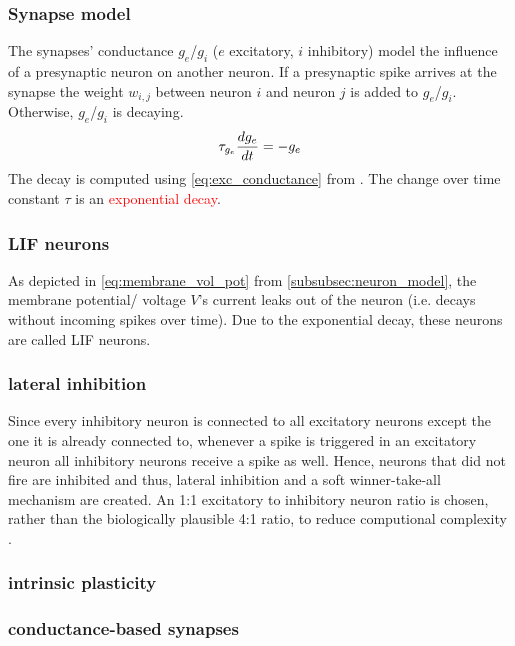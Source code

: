 \subsubsection{Synapse model}
\label{subsubsec:synapse_model}
The synapses' conductance $g_e$/$g_i$ ($e$ excitatory, $i$ inhibitory) model the influence of a presynaptic neuron on another neuron.
If a presynaptic spike arrives at the synapse the weight $w_{i,j}$ between neuron $i$ and neuron $j$ is added to $g_e$/$g_i$.
Otherwise, $g_e$/$g_i$ is decaying.
%
\begin{equation}
    \centering
    \label{eq:exc_conductance}
    \tau_{g_e} \frac{dg_e}{dt} = - g_e
\end{equation}
%
The decay is computed using \autoref{eq:exc_conductance} from \cite{SNN}.
The change over time constant $\tau$ is an \textcolor{red}{exponential decay}.


\subsubsection{\ac{LIF} neurons}
As depicted in \autoref{eq:membrane_vol_pot} from \autoref{subsubsec:neuron_model}, the membrane potential/ voltage $V$'s current leaks out of the neuron 
(i.e. decays without incoming spikes over time).
Due to the exponential decay, these neurons are called \ac{LIF} neurons.


\subsubsection{lateral inhibition}
Since every inhibitory neuron is connected to all excitatory neurons except the one it is already connected to, 
whenever a spike is triggered in an excitatory neuron all inhibitory neurons receive a spike as well.
Hence, neurons that did not fire are inhibited and thus, lateral inhibition and a soft winner-take-all mechanism are created.
An 1:1 excitatory to inhibitory neuron ratio is chosen, rather than the biologically plausible 4:1 ratio, 
to reduce computional complexity \cite{SNN}.


\subsubsection{intrinsic plasticity}


\subsubsection{conductance-based synapses}


